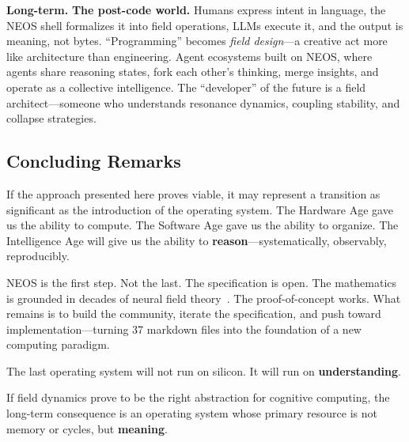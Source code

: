 \textbf{Long-term.} \textbf{The post-code world.} Humans express intent in language, the NEOS shell formalizes it into field operations, LLMs execute it, and the output is meaning, not bytes. ``Programming'' becomes \emph{field design}---a creative act more like architecture than engineering. Agent ecosystems built on NEOS, where agents share reasoning states, fork each other's thinking, merge insights, and operate as a collective intelligence. The ``developer'' of the future is a field architect---someone who understands resonance dynamics, coupling stability, and collapse strategies.

\subsection{Concluding Remarks}

If the approach presented here proves viable, it may represent a transition as significant as the introduction of the operating system. The Hardware Age gave us the ability to compute. The Software Age gave us the ability to organize. The Intelligence Age will give us the ability to \textbf{reason}---systematically, observably, reproducibly.

NEOS is the first step. Not the last. The specification is open. The mathematics is grounded in decades of neural field theory~\cite{amari1977dynamics, wilson1972excitatory, coombes2005waves}. The proof-of-concept works. What remains is to build the community, iterate the specification, and push toward implementation---turning 37 markdown files into the foundation of a new computing paradigm.

\begin{calloutbox}
The last operating system will not run on silicon. It will run on \textbf{understanding}.
\end{calloutbox}

\begin{calloutbox}
If field dynamics prove to be the right abstraction for cognitive
computing, the long-term consequence is an operating system whose
primary resource is not memory or cycles, but \textbf{meaning}.
\end{calloutbox}
